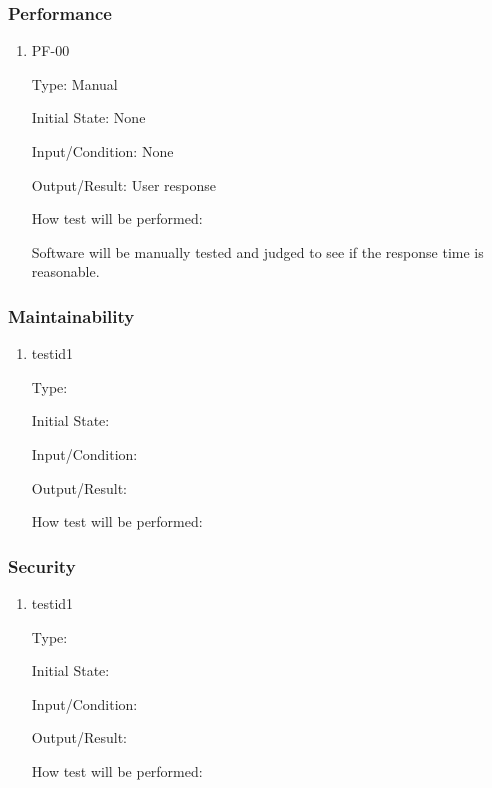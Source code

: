 \documentclass[12pt, titlepage]{article}
\begin{document}
\subsubsection{Performance}

\begin{enumerate}

\item{PF-00\\}

Type: Manual
					
Initial State: None
					
Input/Condition: None
					
Output/Result: User response
					
How test will be performed: 

Software will be manually tested and judged to see if the response time is reasonable. 

\end{enumerate}

\subsubsection{Maintainability}

\begin{enumerate}

\item{testid1\\}

Type: 
					
Initial State: 
					
Input/Condition: 
					
Output/Result: 
					
How test will be performed: 

\end{enumerate}

\subsubsection{Security}

\begin{enumerate}

\item{testid1\\}

Type: 
					
Initial State: 
					
Input/Condition: 
					
Output/Result: 
					
How test will be performed: 

\end{enumerate}
\end{document}
